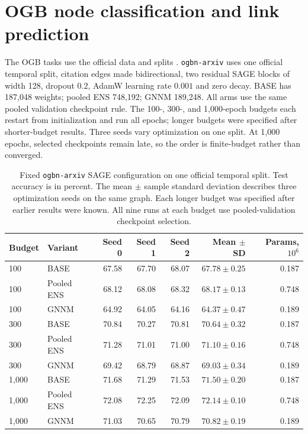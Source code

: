 \section{OGB node classification and link prediction}\label{app:ogb-pilot}
The OGB tasks use the official data and splits \citep{hu2020open}.
\texttt{ogbn-arxiv} uses one official temporal split, citation edges
made bidirectional, two residual SAGE blocks of width 128, dropout
$0.2$, AdamW learning rate $0.001$ and zero decay. BASE has 187,048
weights; pooled ENS 748,192; GNNM 189,248. All arms use the same
pooled validation checkpoint rule. The 100-, 300-, and 1,000-epoch
budgets each restart from initialization and run all epochs; longer
budgets were specified after shorter-budget results. Three seeds
vary optimization on one split. At 1,000 epochs, selected checkpoints
remain late, so the order is finite-budget rather than converged.
\label{app:ogb-1000}

\begin{table}[t]
\centering
\caption{Fixed \texttt{ogbn-arxiv} SAGE configuration on one official temporal split. Test accuracy is in percent. The mean $\pm$ sample standard deviation describes three optimization seeds on the same graph. Each longer budget was specified after earlier results were known. All nine runs at each budget use pooled-validation checkpoint selection.}
\label{tab:ogb-pilot}
\setlength{\tabcolsep}{5pt}
\begin{tabular}{llrrrrr}
\toprule
Budget & Variant & Seed 0 & Seed 1 & Seed 2 & Mean $\pm$ SD & Params, $10^6$\\
\midrule
100 & BASE & 67.58 & 67.70 & 68.07 & $67.78\pm0.25$ & 0.187\\
100 & Pooled ENS & 68.12 & 68.08 & 68.32 & $68.17\pm0.13$ & 0.748\\
100 & GNNM & 64.92 & 64.05 & 64.16 & $64.37\pm0.47$ & 0.189\\
\midrule
300 & BASE & 70.84 & 70.27 & 70.81 & $70.64\pm0.32$ & 0.187\\
300 & Pooled ENS & 71.28 & 71.01 & 71.00 & $71.10\pm0.16$ & 0.748\\
300 & GNNM & 69.42 & 68.79 & 68.87 & $69.03\pm0.34$ & 0.189\\
\midrule
1,000 & BASE & 71.68 & 71.29 & 71.53 & $71.50\pm0.20$ & 0.187\\
1,000 & Pooled ENS & 72.08 & 72.25 & 72.09 & $72.14\pm0.10$ & 0.748\\
1,000 & GNNM & 71.03 & 70.65 & 70.79 & $70.82\pm0.19$ & 0.189\\
\bottomrule
\end{tabular}
\end{table}

